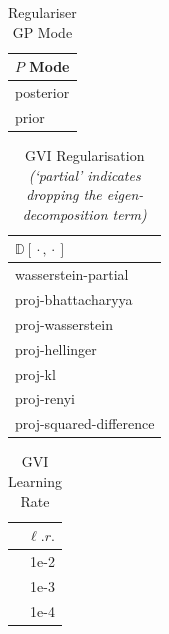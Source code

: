 \documentclass{article}
\newcommand{\wc}{\operatorname{{}\cdot{}}}
\numberwithin{equation}{section}
\begin{document}
\begin{table}[h!]
\tiny
\centering
\begin{tabular}{l}
\toprule
$P$ Mode \\
\midrule
                      posterior \\
                          prior \\
\bottomrule
\end{tabular}
\caption{Regulariser GP Mode}
\end{table}

\begin{table}[h!]
\tiny
\centering
\begin{tabular}{l}
\toprule
  $\mathbb{D}[\wc, \wc]$ \\
\midrule
       wasserstein-partial \\
            proj-bhattacharyya \\
     proj-wasserstein \\
                proj-hellinger \\
                       proj-kl \\
                    proj-renyi \\
proj-squared-difference \\
\bottomrule
\end{tabular}
\caption{GVI Regularisation \textit{(`partial' indicates dropping the eigen-decomposition term)}}
\end{table}

\begin{table}[h!]
\tiny
\centering
\begin{tabular}{r}
\toprule
 $\ell. r.$ \\
\midrule
                    1e-2 \\
                    1e-3 \\
                    1e-4 \\
\bottomrule
\end{tabular}
\caption{GVI Learning Rate}
\end{table}
\end{document}
